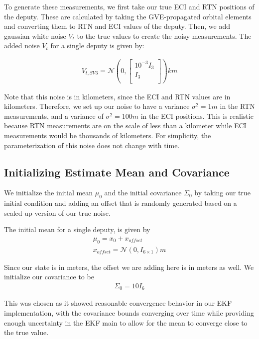 To generate these measurements, we first take our true ECI and RTN positions of the deputy. These are calculated by taking the GVE-propagated orbital elements and converting them to RTN and ECI values of the deputy. Then, we add gaussian white noise $V_t$ to the true values to create the noisy measurements. The added noise $V_t$ for a single deputy is given by:

\begin{align}
    V_{t, SV3} = \mathcal{N}\left(0, \begin{bmatrix}
        10^{-3} I_3 \\
         I_3 \\
 \end{bmatrix}\right) km \label{eq:added_noise}
\end{align}

Note that this noise is in kilometers, since the ECI and RTN values are in kilometers. Therefore, we set up our noise to have a variance $\sigma^2 = 1 m$ in the RTN measurements, and a variance of $\sigma^2 = 100 m$ in the ECI positions. This is realistic because RTN measurements are on the scale of less than a kilometer while ECI measurements would be thousands of kilometers. For simplicity, the parameterization of this noise does not change with time.

\subsection{Initializing Estimate Mean and Covariance}

We initialize the initial mean $\mu_0$ and the initial covariance $\Sigma_0$ by taking our true initial condition and adding an offset that is randomly generated based on a scaled-up version of our true noise.

The initial mean for a single deputy, is given by 
\begin{align}
    \mu_0 = x_0 + x_{offset} \\
    x_{offset} =  \mathcal{N}(0, I_{6\times 1}) m
\end{align}

Since our state is in meters, the offset we are adding here is in meters as well. 
We initialize our covariance to be 
\begin{align}
    \Sigma_0 = 10I_6
\end{align}

This was chosen as it showed reasonable convergence behavior in our EKF implementation, with the covariance bounds converging over time while providing enough uncertainty in the EKF main to allow for the mean to converge close to the true value.

